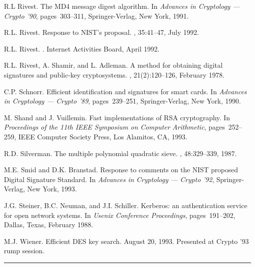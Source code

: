 \begin{thebibliography}{10}
R.L Rivest.
\newblock The {MD4} message digest algorithm.
\newblock In {\it Advances in Cryptology --- Crypto '90}, pages~303--311,
  Springer-Verlag, New York, 1991.

R.L. Rivest.
\newblock Response to {NIST}'s proposal.
, 35:41--47, July 1992.

R.L. Rivest.
.
\newblock Internet Activities Board, April 1992.

R.L. Rivest, A. Shamir, and L. Adleman.
\newblock A method for obtaining digital signatures and public-key
  cryptosystems.
, 21(2):120--126, February 1978.

C.P. Schnorr.
\newblock Efficient identification and signatures for smart cards.
\newblock In {\it Advances in Cryptology --- Crypto '89}, pages~239--251,
  Springer-Verlag, New York, 1990.

M. Shand and J. Vuillemin.
\newblock Fast implementations of {RSA} cryptography.
\newblock In {\it Proceedings of the 11th IEEE Symposium on Computer
  Arithmetic}, pages~252--259, IEEE Computer Society Press, Los Alamitos, CA,
  1993.

R.D. Silverman.
\newblock The multiple polynomial quadratic sieve.
, 48:329--339, 1987.

M.E. Smid and D.K. Branstad.
\newblock Response to comments on the {NIST} proposed {Digital Signature
  Standard}.
\newblock In {\it Advances in Cryptology --- Crypto '92}, Springer-Verlag, New
  York, 1993.

J.G. Steiner, B.C. Neuman, and J.I. Schiller.
\newblock Kerberos: an authentication service for open network systems.
\newblock In {\it Usenix Conference Proceedings}, pages~191--202, Dallas,
  Texas, February 1988.

M.J. Wiener.
\newblock Efficient {DES} key search.
\newblock August 20, 1993.
\newblock Presented at Crypto '93 rump session.

\end{thebibliography}


\begin{center} \rule{4in}{.2mm} \end{center}


